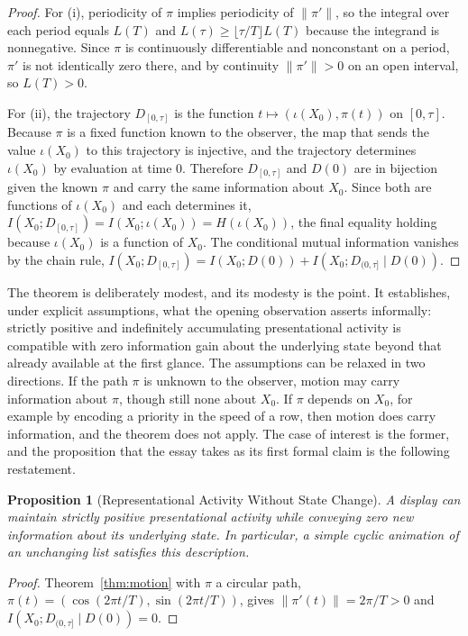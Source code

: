 \documentclass[11pt]{report}
\newtheorem{proposition}[theorem]{Proposition}
\theoremstyle{definition}
\theoremstyle{remark}
\begin{document}
\begin{proof}
For (i), periodicity of $\pi$ implies periodicity of $\|\pi'\|$, so the integral over each period equals $L(T)$ and $L(\tau)\ge\lfloor\tau/T\rfloor L(T)$ because the integrand is nonnegative. Since $\pi$ is continuously differentiable and nonconstant on a period, $\pi'$ is not identically zero there, and by continuity $\|\pi'\|>0$ on an open interval, so $L(T)>0$.

For (ii), the trajectory $D_{[0,\tau]}$ is the function $t\mapsto(\iota(X_0),\pi(t))$ on $[0,\tau]$. Because $\pi$ is a fixed function known to the observer, the map that sends the value $\iota(X_0)$ to this trajectory is injective, and the trajectory determines $\iota(X_0)$ by evaluation at time $0$. Therefore $D_{[0,\tau]}$ and $D(0)$ are in bijection given the known $\pi$ and carry the same information about $X_0$. Since both are functions of $\iota(X_0)$ and each determines it, $I(X_0;D_{[0,\tau]})=I(X_0;\iota(X_0))=H(\iota(X_0))$, the final equality holding because $\iota(X_0)$ is a function of $X_0$. The conditional mutual information vanishes by the chain rule, $I(X_0;D_{[0,\tau]})=I(X_0;D(0))+I(X_0;D_{(0,\tau]}\mid D(0))$.
\end{proof}

The theorem is deliberately modest, and its modesty is the point. It establishes, under explicit assumptions, what the opening observation asserts informally: strictly positive and indefinitely accumulating presentational activity is compatible with zero information gain about the underlying state beyond that already available at the first glance. The assumptions can be relaxed in two directions. If the path $\pi$ is unknown to the observer, motion may carry information about $\pi$, though still none about $X_0$. If $\pi$ depends on $X_0$, for example by encoding a priority in the speed of a row, then motion does carry information, and the theorem does not apply. The case of interest is the former, and the proposition that the essay takes as its first formal claim is the following restatement.

\begin{proposition}[Representational Activity Without State Change]\label{prop:rep}
A display can maintain strictly positive presentational activity while conveying zero new information about its underlying state. In particular, a simple cyclic animation of an unchanging list satisfies this description.
\end{proposition}

\begin{proof}
Theorem~\ref{thm:motion} with $\pi$ a circular path, $\pi(t)=(\cos(2\pi t/T),\sin(2\pi t/T))$, gives $\|\pi'(t)\|=2\pi/T>0$ and $I(X_0;D_{(0,\tau]}\mid D(0))=0$.
\end{proof}
\end{document}
